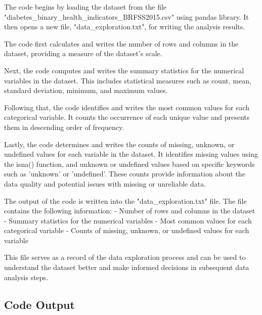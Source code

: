 \documentclass[11pt]{article}
\begin{document}
The code begins by loading the dataset from the file "diabetes\_binary\_health\_indicators\_BRFSS2015.csv" using pandas library. It then opens a new file, "data\_exploration.txt", for writing the analysis results.

The code first calculates and writes the number of rows and columns in the dataset, providing a measure of the dataset's scale.

Next, the code computes and writes the summary statistics for the numerical variables in the dataset. This includes statistical measures such as count, mean, standard deviation, minimum, and maximum values.

Following that, the code identifies and writes the most common values for each categorical variable. It counts the occurrence of each unique value and presents them in descending order of frequency.

Lastly, the code determines and writes the counts of missing, unknown, or undefined values for each variable in the dataset. It identifies missing values using the isna() function, and unknown or undefined values based on specific keywords such as 'unknown' or 'undefined'. These counts provide information about the data quality and potential issues with missing or unreliable data.

The output of the code is written into the "data\_exploration.txt" file. The file contains the following information:
- Number of rows and columns in the dataset
- Summary statistics for the numerical variables
- Most common values for each categorical variable
- Counts of missing, unknown, or undefined values for each variable

This file serves as a record of the data exploration process and can be used to understand the dataset better and make informed decisions in subsequent data analysis steps.

\subsection*{Code Output}
\end{document}
